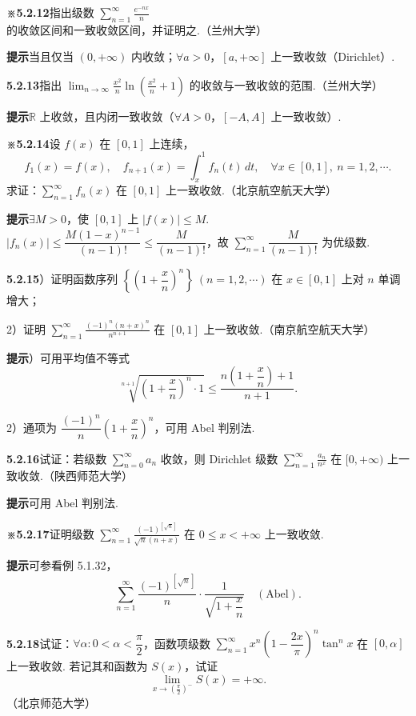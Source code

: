 \documentclass[UTF8, 12pt, fontset=fandol, oneside]{ctexart}
\begin{document}
\noindent\textbf{※5.2.12}\quad 指出级数 $\displaystyle\sum_{n=1}^{\infty}\frac{e^{-nx}}n$ 的收敛区间和一致收敛区间，并证明之.（兰州大学）

\noindent\textbf{提示}\quad 当且仅当 $(0,+\infty)$ 内收敛；$\forall a>0$，$[a,+\infty]$ 上一致收敛（Dirichlet）.

\noindent\textbf{5.2.13}\quad 指出 $\displaystyle\lim_{n\to\infty}\frac{x^2}{n}\ln\left(\frac{x^2}{n}+1\right)$ 的收敛与一致收敛的范围.（兰州大学）

\noindent\textbf{提示}\quad $\mathbb R$ 上收敛，且内闭一致收敛（$\forall A>0$，$[-A,A]$ 上一致收敛）.

\noindent\textbf{※5.2.14}\quad 设 $f(x)$ 在 $[0,1]$ 上连续，
\[
  f_1(x)=f(x),\quad f_{n+1}(x)=\int_x^1 f_n(t)\,dt,\quad \forall x\in[0,1],\ n=1,2,\cdots.
\]
求证：$\displaystyle\sum_{n=1}^{\infty}f_n(x)$ 在 $[0,1]$ 上一致收敛.（北京航空航天大学）

\noindent\textbf{提示}\quad $\exists M>0$，使 $[0,1]$ 上 $|f(x)|\le M$.
$|f_n(x)|\le\dfrac{M(1-x)^{n-1}}{(n-1)!}\le\dfrac M{(n-1)!}$，故
$\displaystyle\sum_{n=1}^{\infty}\dfrac M{(n-1)!}$ 为优级数.

\noindent\textbf{5.2.15}）证明函数序列
$\left\{\left(1+\dfrac xn\right)^n\right\}\ (n=1,2,\cdots)$ 在 $x\in[0,1]$ 上对 $n$ 单调增大；

2）证明 $\displaystyle\sum_{n=1}^{\infty}\frac{(-1)^n(n+x)^n}{n^{n+1}}$ 在 $[0,1]$ 上一致收敛.（南京航空航天大学）

\noindent\textbf{提示}）可用平均值不等式
\[
  \sqrt[n+1]{\left(1+\frac xn\right)^n\cdot1}
  \le\frac{n\left(1+\dfrac xn\right)+1}{n+1}.
\]

2）通项为 $\dfrac{(-1)^n}{n}\left(1+\dfrac xn\right)^n$，可用 Abel 判别法.

\noindent\textbf{5.2.16}\quad 试证：若级数 $\displaystyle\sum_{n=0}^{\infty}a_n$ 收敛，则 Dirichlet 级数
$\displaystyle\sum_{n=1}^{\infty}\frac{a_n}{n^x}$ 在 $[0,+\infty)$ 上一致收敛.（陕西师范大学）

\noindent\textbf{提示}\quad 可用 Abel 判别法.

\noindent\textbf{※5.2.17}\quad 证明级数
$\displaystyle\sum_{n=1}^{\infty}\frac{(-1)^{[\sqrt n]}}{\sqrt n(n+x)}$ 在 $0\le x<+\infty$ 上一致收敛.

\noindent\textbf{提示}\quad 可参看例 5.1.32，
\[
  \sum_{n=1}^{\infty}\frac{(-1)^{[\sqrt n]}}n\cdot\frac1{\sqrt{1+\dfrac xn}}\quad(\text{Abel}).
\]

\noindent\textbf{5.2.18}\quad 试证：$\forall\alpha:0<\alpha<\dfrac\pi2$，函数项级数
$\displaystyle\sum_{n=1}^{\infty}x^n\left(1-\dfrac{2x}{\pi}\right)^n\tan^n x$ 在 $[0,\alpha]$ 上一致收敛. 若记其和函数为
$S(x)$，试证
\[
  \lim_{x\to(\frac\pi2)^-}S(x)=+\infty.
\]
（北京师范大学）
\end{document}
